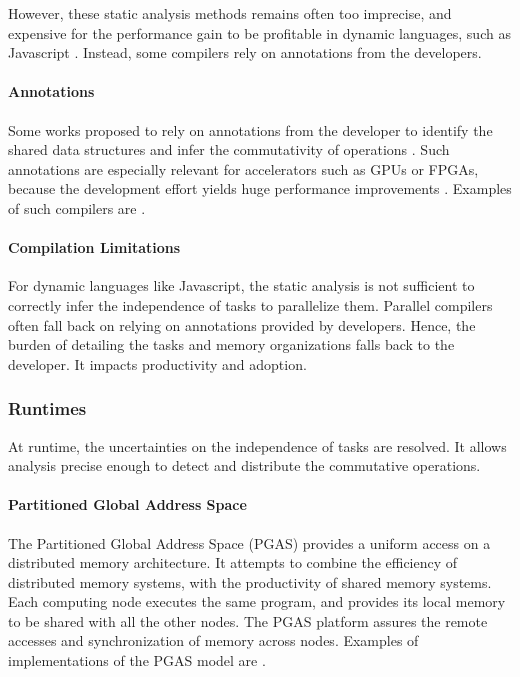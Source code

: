 However, these static analysis methods remains often too imprecise, and expensive for the performance gain to be profitable in dynamic languages, such as Javascript \cite{Shivers1991}.
Instead, some compilers rely on annotations from the developers.

\paragraph{Annotations}

Some works proposed to rely on annotations from the developer to identify the shared data structures and infer the commutativity of operations \cite{Vandierendonck2010a,Fernandez2014a}.
Such annotations are especially relevant for accelerators such as GPUs or FPGAs, because the development effort yields huge performance improvements \cite{Tarditi2006}.
Examples of such compilers are .


\paragraph{Compilation Limitations}

For dynamic languages like Javascript, the static analysis is not sufficient to correctly infer the independence of tasks to parallelize them.
Parallel compilers often fall back on relying on annotations provided by developers.
Hence, the burden of detailing the tasks and memory organizations falls back to the developer.
It impacts productivity and adoption.

\subsubsection{Runtimes} \label{chapter3:software-adoption:runtimes}

At runtime, the uncertainties on the independence of tasks are resolved.
It allows analysis precise enough to detect and distribute the commutative operations.

\paragraph{Partitioned Global Address Space}

The Partitioned Global Address Space (PGAS) provides a uniform access on a distributed memory architecture.
It attempts to combine the efficiency of distributed memory systems, with the productivity of shared memory systems.
Each computing node executes the same program, and provides its local memory to be shared with all the other nodes.
The PGAS platform assures the remote accesses and synchronization of memory across nodes.
Examples of implementations of the PGAS model are .

